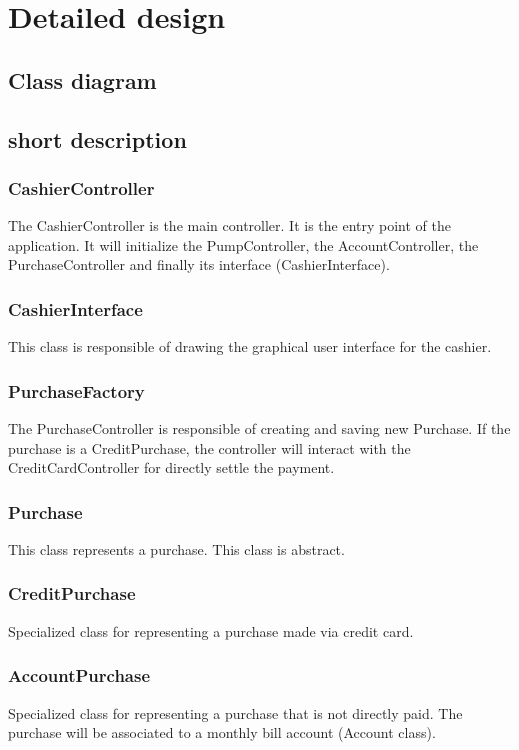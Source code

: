 \documentclass[11pt, a4paper]{article}
\begin{document}
\section{Detailed design}
\subsection*{Class diagram}

\subsection*{short description}

\subsubsection*{CashierController}
The CashierController is the main controller. It is the entry point of the application. It will initialize the PumpController, the AccountController, the PurchaseController and finally its interface (CashierInterface).

\subsubsection*{CashierInterface}
This class is responsible of drawing the graphical user interface for the cashier.

\subsubsection*{PurchaseFactory}
The PurchaseController is responsible of creating and saving new Purchase. If the purchase is a CreditPurchase, the controller will interact with the CreditCardController for directly settle the payment.

\subsubsection*{Purchase}
This class represents a purchase. This class is abstract.

\subsubsection*{CreditPurchase}
Specialized class for representing a purchase made via credit card.

\subsubsection*{AccountPurchase}
Specialized class for representing a purchase that is not directly paid. The purchase will be associated to a monthly bill account (Account class).
\end{document}
